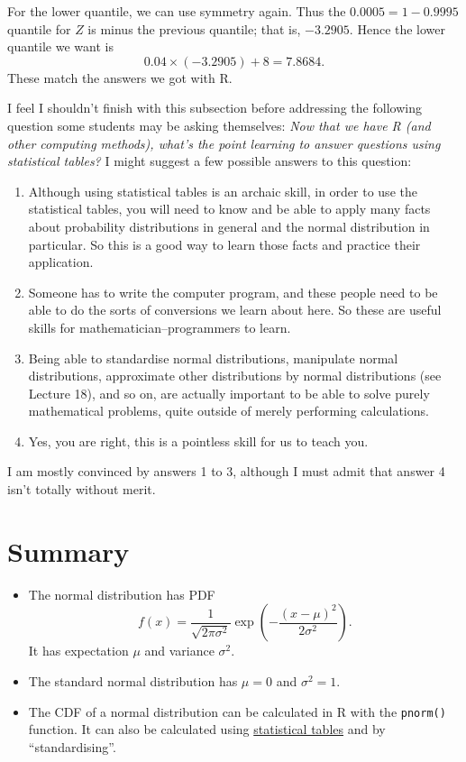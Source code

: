 \documentclass[
  a4paper,
]{book}
\providecommand{\tightlist}{%
  \setlength{\itemsep}{0pt}\setlength{\parskip}{0pt}}
\theoremstyle{definition}
\theoremstyle{definition}
\theoremstyle{definition}
\theoremstyle{definition}
\theoremstyle{remark}
\begin{document}
For the lower quantile, we can use symmetry again. Thus the \(0.0005 = 1 - 0.9995\) quantile for \(Z\) is minus the previous quantile; that is, \(-3.2905\). Hence the lower quantile we want is
\[0.04\times (-3.2905) + 8 = 7.8684. \]
These match the answers we got with R.

I feel I shouldn't finish with this subsection before addressing the following question some students may be asking themselves: \emph{Now that we have R (and other computing methods), what's the point learning to answer questions using statistical tables?} I might suggest a few possible answers to this question:

\begin{enumerate}
\def\labelenumi{\arabic{enumi}.}
\tightlist
\item
  Although using statistical tables is an archaic skill, in order to use the statistical tables, you will need to know and be able to apply many facts about probability distributions in general and the normal distribution in particular. So this is a good way to learn those facts and practice their application.
\item
  Someone has to write the computer program, and these people need to be able to do the sorts of conversions we learn about here. So these are useful skills for mathematician--programmers to learn.
\item
  Being able to standardise normal distributions, manipulate normal distributions, approximate other distributions by normal distributions (see Lecture 18), and so on, are actually important to be able to solve purely mathematical problems, quite outside of merely performing calculations.
\item
  Yes, you are right, this is a pointless skill for us to teach you.
\end{enumerate}

I am mostly convinced by answers 1 to 3, although I must admit that answer 4 isn't totally without merit.

\hypertarget{summary-L16}{%
\section*{Summary}\label{summary-L16}}

\begin{itemize}
\tightlist
\item
  The normal distribution has PDF
  \[ f(x) = \frac{1}{\sqrt{2\pi\sigma^2}} \exp \left(- \frac{(x - \mu)^2}{2\sigma^2} \right) .\]
  It has expectation \(\mu\) and variance \(\sigma^2\).
\item
  The standard normal distribution has \(\mu = 0\) and \(\sigma^2 = 1\).
\item
  The CDF of a normal distribution can be calculated in R with the \texttt{pnorm()} function. It can also be calculated using \href{https://mpaldridge.github.io/math1710/stat-tab.pdf}{statistical tables} and by ``standardising''.
\end{itemize}
\end{document}
